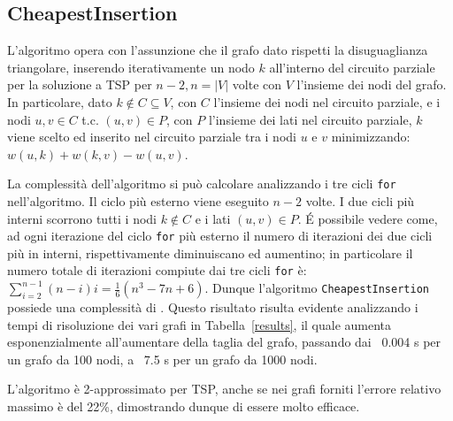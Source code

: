 \subsection{CheapestInsertion}

L'algoritmo opera con l'assunzione che il grafo dato rispetti la disuguaglianza triangolare, inserendo iterativamente un nodo $k$ all'interno del circuito parziale per la soluzione a TSP per $n-2, n=|V|$ volte con $V$ l'insieme dei nodi del grafo. In particolare, dato $k \notin C \subseteq V$, con $C$ l'insieme dei nodi nel circuito parziale, e i nodi $u,v \in C$ \mbox{t.c.} $(u,v)\in P$, con $P$ l'insieme dei lati nel circuito parziale, $k$ viene scelto ed inserito nel circuito parziale tra i nodi $u$ e $v$ minimizzando: $w(u,k)+w(k,v)-w(u,v)$.

La complessità dell'algoritmo si può calcolare analizzando i tre cicli \texttt{for} nell'algoritmo. Il ciclo più esterno viene eseguito $n-2$ volte. I due cicli più interni scorrono tutti i nodi $k \notin C$ e i lati $(u,v)\in P$. \'E possibile vedere come, ad ogni iterazione del ciclo \texttt{for} più esterno il numero di iterazioni dei due cicli più in interni, rispettivamente diminuiscano ed aumentino; in particolare il numero totale di iterazioni compiute dai tre cicli \texttt{for} è: $\sum_{i=2}^{n-1} (n-i)i=\frac{1}{6}(n^3-7n+6)$. Dunque l'algoritmo \texttt{CheapestInsertion} possiede una complessità di .
Questo risultato risulta evidente analizzando i tempi di risoluzione dei vari grafi in Tabella~\ref{results}, il quale aumenta esponenzialmente all'aumentare della taglia del grafo, passando dai ~0.004 s per un grafo da 100 nodi, a ~7.5 s per un grafo da 1000 nodi.

L'algoritmo è 2-approssimato per TSP, anche se nei grafi forniti l'errore relativo massimo è del 22\%, dimostrando dunque di essere molto efficace.

